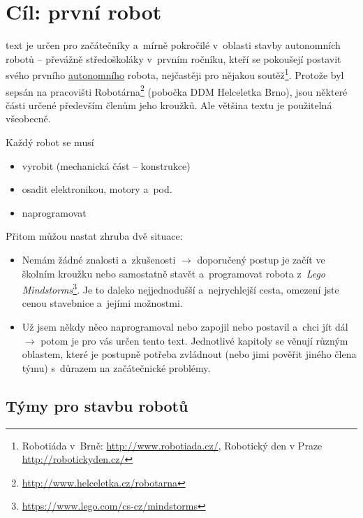 \section{Cíl: první robot}

text je určen pro začátečníky a~mírně pokročilé v~oblasti stavby autonomních robotů -- převážně středoškoláky v~prvním ročníku, kteří se pokoušejí postavit svého prvního \hyperlink{autonomni}{autonomního}
robota, nejčastěji pro nějakou soutěž\footnote{Robotiáda v~Brně: 
\url{http://www.robotiada.cz/}, Robotický den v Praze \url{http://robotickyden.cz/} }. 
Protože byl sepsán na pracovišti Robotárna\footnote{\url{http://www.helceletka.cz/robotarna}} (pobočka DDM Helceletka Brno), jsou některé části určené především členům jeho kroužků. Ale většina textu je použitelná všeobecně.

Každý robot se musí 
\begin{itemize} 	%
\item vyrobit (mechanická část -- konstrukce)
\item osadit elektronikou, motory a~pod.
\item naprogramovat 
\end{itemize}

Přitom můžou nastat zhruba dvě situace:

\begin{itemize} %
\item  Nemám žádné znalosti a~zkušenosti $\rightarrow$ doporučený 
postup je začít ve školním kroužku nebo samostatně stavět a~programovat 
robota z~{\it Lego Mindstorms}\footnote{\url{https://www.lego.com/cs-cz/mindstorms}}.
Je to daleko nejjednodušší a~nejrychlejší cesta, omezení jste cenou stavebnice a~jejími možnostmi.
\item  Už jsem někdy něco naprogramoval nebo zapojil nebo postavil a~chci jít dál $\rightarrow$ potom je pro vás určen tento text.
Jednotlivé kapitoly se věnují různým oblastem, které je postupně potřeba zvládnout (nebo jimi pověřit jiného člena týmu) s~důrazem na začátečnické problémy.
\end{itemize}

\subsection{Týmy pro stavbu robotů}

